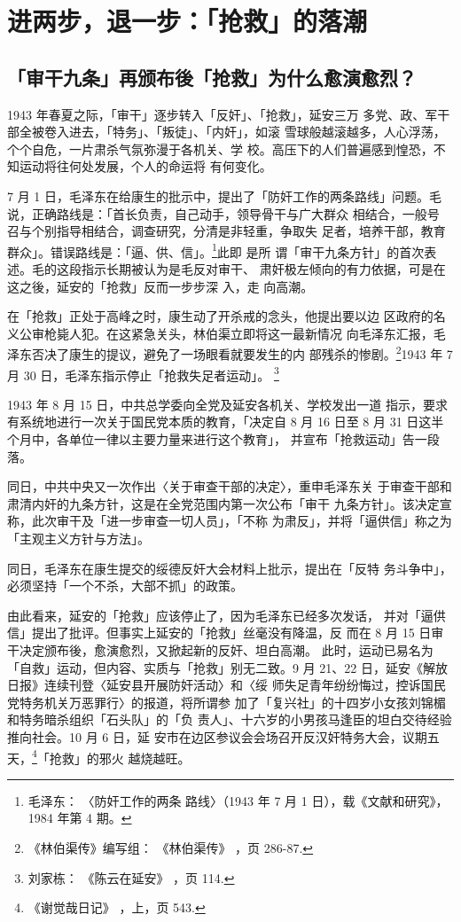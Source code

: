 \chapter{进两步，退一步：「抢救」的落潮}
\section{「审干九条」再颁布後「抢救」为什么愈演愈烈？}

1943 年春夏之际，「审干」逐步转入「反奸」、「抢救」，延安三万
多党、政、军干部全被卷入进去，「特务」、「叛徒」、「内奸」，如滚
雪球般越滚越多，人心浮荡，个个自危，一片肃杀气氛弥漫于各机关、学
校。高压下的人们普遍感到惶恐，不知运动将往何处发展，个人的命运将
有何变化。

7 月 1 日，毛泽东在给康生的批示中，提出了「防奸工作的两条路线」问题。毛
说，正确路线是：「首长负责，自己动手，领导骨干与广大群众 相结合，一般号
召与个别指导相结合，调查研究，分清是非轻重，争取失 足者，培养干部，教育
群众」。错误路线是：「逼、供、信」。\footnote{毛泽东： 〈防奸工作的两条
路线〉（1943 年 7 月 1 日），载《文献和研究》，1984 年第 4 期。}此即
是所 谓「审干九条方针」的首次表述。毛的这段指示长期被认为是毛反对审干、
肃奸极左倾向的有力依据，可是在这之後，延安的「抢救」反而一步步深 入，走
向高潮。

在「抢救」正处于高峰之时，康生动了开杀戒的念头，他提出要以边
区政府的名义公审枪毙人犯。在这紧急关头，林伯渠立即将这一最新情况
向毛泽东汇报，毛泽东否决了康生的提议，避免了一场眼看就要发生的内
部残杀的惨剧。\footnote{《林伯渠传》编写组：
《林伯渠传》
，页 286-87.}1943 年 7 月 30 日，毛泽东指示停止「抢救失足者运动」。
\footnote{刘家栋：
《陈云在延安》
，页 114.}

1943 年 8 月 15 日，中共总学委向全党及延安各机关、学校发出一道
指示，要求有系统地进行一次关于国民党本质的教育，「决定自 8 月 16
日至 8 月 31 日这半个月中，各单位一律以主要力量来进行这个教育」，
并宣布「抢救运动」告一段落。

同日，中共中央又一次作出〈关于审查干部的决定〉，重申毛泽东关
于审查干部和肃清内奸的九条方针，这是在全党范围内第一次公布「审干
九条方针」。该决定宣称，此次审干及「进一步审查一切人员」，「不称
为肃反」，并将「逼供信」称之为「主观主义方针与方法」。

同日，毛泽东在康生提交的绥德反奸大会材料上批示，提出在「反特
务斗争中」，必须坚持「一个不杀，大部不抓」的政策。

由此看来，延安的「抢救」应该停止了，因为毛泽东已经多次发话，
并对「逼供信」提出了批评。但事实上延安的「抢救」丝毫没有降温，反
而在 8 月 15 日审干决定颁布後，愈演愈烈，又掀起新的反奸、坦白高潮。
此时，运动已易名为「自救」运动，但内容、实质与「抢救」别无二致。9
月 21、22 日，延安《解放日报》连续刊登〈延安县开展防奸活动〉和〈绥
师失足青年纷纷悔过，控诉国民党特务机关万恶罪行〉的报道，将所谓参
加了「复兴社」的十四岁小女孩刘锦楣和特务暗杀组织「石头队」的「负
责人」、十六岁的小男孩马逢臣的坦白交待经验推向社会。10 月 6 日，延
安市在边区参议会会场召开反汉奸特务大会，议期五天，\footnote{《谢觉哉日记》
，上，页 543.}「抢救」的邪火
越烧越旺。


